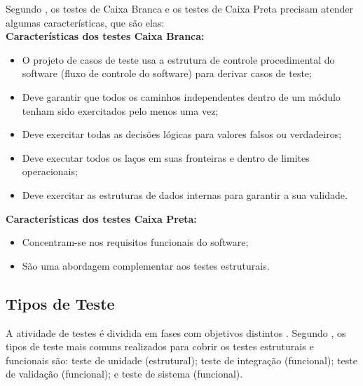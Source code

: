 Segundo , os testes de Caixa Branca e os testes de Caixa Preta precisam atender algumas características, que são elas:\\

\textbf{Características dos testes Caixa Branca:}

\begin{itemize}
    \item O projeto de casos de teste usa a estrutura de controle procedimental do software (fluxo de controle do software) para derivar casos de teste;
    \item Deve garantir que todos os caminhos independentes dentro de um módulo tenham sido exercitados pelo menos uma vez;
    \item Deve exercitar todas as decisões lógicas para valores falsos ou verdadeiros;
    \item Deve executar todos os laços em suas fronteiras e dentro de limites operacionais;
    \item Deve exercitar as estruturas de dados internas para garantir a sua validade.
\end{itemize}



\textbf{Características dos testes Caixa Preta:}

\begin{itemize}
    \item Concentram-se nos requisitos funcionais do software;
    \item São uma abordagem complementar aos testes estruturais.
\end{itemize}



\subsection{Tipos de Teste}


A atividade de testes é dividida em fases com objetivos distintos \cite{DELAMARO2007}. Segundo , os tipos de teste mais comuns realizados para cobrir os testes estruturais e funcionais são: teste de unidade (estrutural); teste de integração (funcional); teste de validação (funcional); e teste de sistema (funcional).

